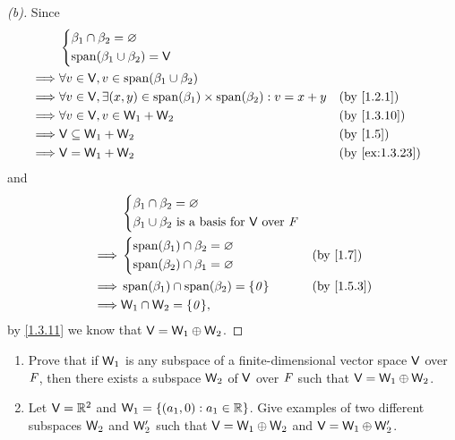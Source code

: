 \begin{proof}[(b)]
  Since
  \begin{align*}
             & \begin{dcases}
      \beta_1 \cap \beta_2 = \varnothing \\
      \spn{\beta_1 \cup \beta_2} = \V
    \end{dcases}                                                                                           \\
    \implies & \forall v \in \V, v \in \spn{\beta_1 \cup \beta_2}                                                                    \\
    \implies & \forall v \in \V, \exists (x, y) \in \spn{\beta_1} \times \spn{\beta_2} : v = x + y &  & \text{(by \cref{1.2.1})}     \\
    \implies & \forall v \in \V, v \in \W_1 + \W_2                                                 &  & \text{(by \cref{1.3.10})}    \\
    \implies & \V \subseteq \W_1 + \W_2                                                            &  & \text{(by \cref{1.5})}       \\
    \implies & \V = \W_1 + \W_2                                                                    &  & \text{(by \cref{ex:1.3.23})}
  \end{align*}
  and
  \begin{align*}
             & \begin{dcases}
      \beta_1 \cap \beta_2 = \varnothing \\
      \beta_1 \cup \beta_2 \text{ is a basis for } \V \text{ over } \F
    \end{dcases}                                                \\
    \implies & \begin{dcases}
      \spn{\beta_1} \cap \beta_2 = \varnothing \\
      \spn{\beta_2} \cap \beta_1 = \varnothing
    \end{dcases}                  &  & \text{(by \cref{1.7})}   \\
    \implies & \spn{\beta_1} \cap \spn{\beta_2} = \set{\zv} &  & \text{(by \cref{1.5.3})} \\
    \implies & \W_1 \cap \W_2 = \set{\zv},
  \end{align*}
  by \cref{1.3.11} we know that \(\mathsf{V} = \mathsf{W}_1 \oplus \mathsf{W}_2\).
\end{proof}

\begin{ex}\label{ex:1.6.34}
  \quad
  \begin{enumerate}
    \item Prove that if \(\mathsf{W}_1\) is any subspace of a finite-dimensional vector space \(\mathsf{V}\) over \(\mathit{F}\), then there exists a subspace \(\mathsf{W}_2\) of \(\mathsf{V}\) over \(\mathit{F}\) such that \(\mathsf{V} = \mathsf{W}_1 \oplus \mathsf{W}_2\).
    \item Let \(\mathsf{V} = \mathbb{R}^2\) and \(\mathsf{W}_1 = \left\lbrace(a_1, 0) : a_1 \in \mathbb{R}\right\rbrace\).
          Give examples of two different subspaces \(\mathsf{W}_2\) and \(\mathsf{W}_2'\) such that \(\mathsf{V} = \mathsf{W}_1 \oplus \mathsf{W}_2\) and \(\mathsf{V} = \mathsf{W}_1 \oplus \mathsf{W}_2'\).
  \end{enumerate}
\end{ex}

